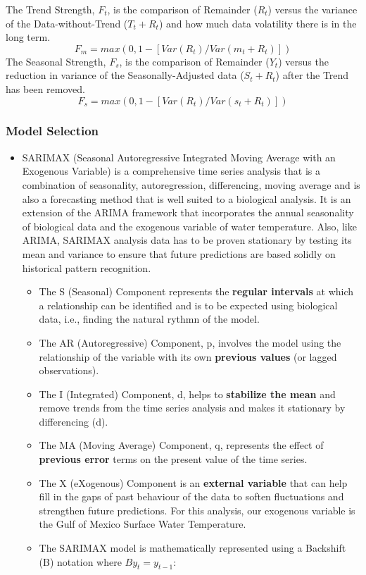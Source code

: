 \documentclass[
  letterpaper,
  DIV=11,
  numbers=noendperiod]{scrartcl}
\begin{document}
The Trend Strength, \(F_t\), is the comparison of Remainder (\(R_t\))
versus the variance of the Data-without-Trend (\(T_t + R_t\)) and how
much data volatility there is in the long term. \[
F_m = max(0,1-[Var(R_t)/Var(m_t + R_t)])
\] The Seasonal Strength, \(F_s\), is the comparison of Remainder
(\(Y_t\)) versus the reduction in variance of the Seasonally-Adjusted
data (\(S_t + R_t\)) after the Trend has been removed. \[
F_s = max(0,1-[Var(R_t)/Var(s_t + R_t)])
\]

\subsubsection{Model Selection}\label{model-selection}

\begin{itemize}
\item
  SARIMAX (Seasonal Autoregressive Integrated Moving Average with an
  Exogenous Variable) is a comprehensive time series analysis that is a
  combination of seasonality, autoregression, differencing, moving
  average and is also a forecasting method that is well suited to a
  biological analysis. It is an extension of the ARIMA framework that
  incorporates the annual seasonality of biological data and the
  exogenous variable of water temperature. Also, like ARIMA, SARIMAX
  analysis data has to be proven stationary by testing its mean and
  variance to ensure that future predictions are based solidly on
  historical pattern recognition.

  \begin{itemize}
  \item
    The S (Seasonal) Component represents the \textbf{regular intervals}
    at which a relationship can be identified and is to be expected
    using biological data, i.e., finding the natural rythmn of the
    model.
  \item
    The AR (Autoregressive) Component, p, involves the model using the
    relationship of the variable with its own \textbf{previous values}
    (or lagged observations).
  \item
    The I (Integrated) Component, d, helps to \textbf{stabilize the
    mean} and remove trends from the time series analysis and makes it
    stationary by differencing (d).
  \item
    The MA (Moving Average) Component, q, represents the effect of
    \textbf{previous error} terms on the present value of the time
    series.
  \item
    The X (eXogenous) Component is an \textbf{external variable} that
    can help fill in the gaps of past behaviour of the data to soften
    fluctuations and strengthen future predictions. For this analysis,
    our exogenous variable is the Gulf of Mexico Surface Water
    Temperature.
  \item
    The SARIMAX model is mathematically represented using a Backshift
    (B) notation where \(By_t=y_{t-1}\):
  \end{itemize}
\end{itemize}
\end{document}
